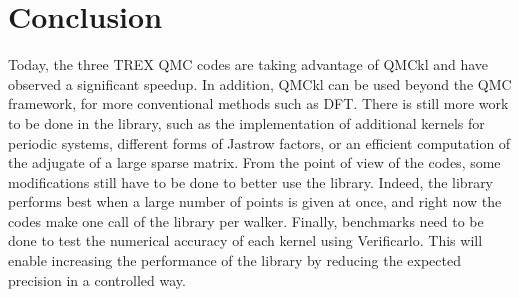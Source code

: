 \section{Conclusion}

Today, the three TREX QMC codes are taking advantage of QMCkl and have
observed a significant speedup. In addition, QMCkl can be used beyond the QMC framework,
for more conventional methods such as \ac{DFT}. There is still more work to be
done in the library, such as the implementation of additional kernels for
periodic systems, different forms of Jastrow factors, or an efficient computation of the
adjugate of a large sparse matrix.
From the point of view of the codes, some modifications still have to be done to better use
the library. Indeed, the library performs best when a large number of points is given at once, and right now the codes make one call of the library per walker.
Finally, benchmarks need to be done to test the numerical accuracy of each kernel using
Verificarlo. 
This will enable increasing the performance of the library by reducing the expected precision in a controlled way.
